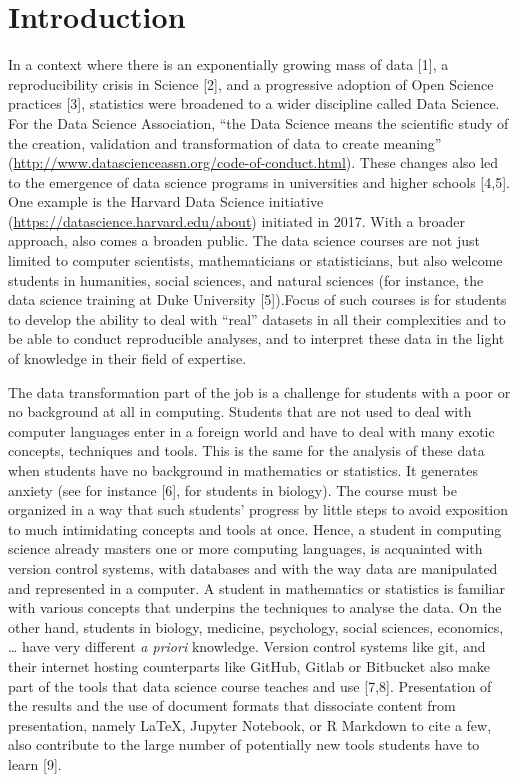 \documentclass{aims}
\theoremstyle{definition}
\begin{document}
\hypertarget{introduction}{%
\section{Introduction}\label{introduction}}

In a context where there is an exponentially growing mass of data
{[}1{]}, a reproducibility crisis in Science {[}2{]}, and a progressive
adoption of Open Science practices {[}3{]}, statistics were broadened to
a wider discipline called Data Science. For the Data Science
Association, ``the Data Science means the scientific study of the
creation, validation and transformation of data to create meaning''
(\url{http://www.datascienceassn.org/code-of-conduct.html}). These
changes also led to the emergence of data science programs in
universities and higher schools {[}4,5{]}. One example is the Harvard
Data Science initiative (\url{https://datascience.harvard.edu/about})
initiated in 2017. With a broader approach, also comes a broaden public.
The data science courses are not just limited to computer scientists,
mathematicians or statisticians, but also welcome students in
humanities, social sciences, and natural sciences (for instance, the
data science training at Duke University {[}5{]}).Focus of such courses
is for students to develop the ability to deal with ``real'' datasets in
all their complexities and to be able to conduct reproducible analyses,
and to interpret these data in the light of knowledge in their field of
expertise.

The data transformation part of the job is a challenge for students with
a poor or no background at all in computing. Students that are not used
to deal with computer languages enter in a foreign world and have to
deal with many exotic concepts, techniques and tools. This is the same
for the analysis of these data when students have no background in
mathematics or statistics. It generates anxiety (see for instance
{[}6{]}, for students in biology). The course must be organized in a way
that such students' progress by little steps to avoid exposition to much
intimidating concepts and tools at once. Hence, a student in computing
science already masters one or more computing languages, is acquainted
with version control systems, with databases and with the way data are
manipulated and represented in a computer. A student in mathematics or
statistics is familiar with various concepts that underpins the
techniques to analyse the data. On the other hand, students in biology,
medicine, psychology, social sciences, economics, \ldots{} have very
different \emph{a priori} knowledge. Version control systems like git,
and their internet hosting counterparts like GitHub, Gitlab or Bitbucket
also make part of the tools that data science course teaches and use
{[}7,8{]}. Presentation of the results and the use of document formats
that dissociate content from presentation, namely LaTeX, Jupyter
Notebook, or R Markdown to cite a few, also contribute to the large
number of potentially new tools students have to learn {[}9{]}.
\end{document}

